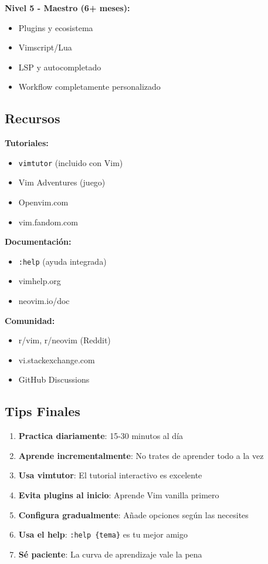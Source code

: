 \documentclass[
  doc,
  floatsintext,
  longtable,
  a4paper,
  nolmodern,
  notxfonts,
  notimes,
  12pt,
  colorlinks=true,linkcolor=blue,citecolor=blue,urlcolor=blue]{apa7}
\providecommand{\tightlist}{%
  \setlength{\itemsep}{0pt}\setlength{\parskip}{0pt}}
\begin{document}
\textbf{Nivel 5 - Maestro (6+ meses):}

\begin{itemize}
\tightlist
\item
  Plugins y ecosistema
\item
  Vimscript/Lua
\item
  LSP y autocompletado
\item
  Workflow completamente personalizado
\end{itemize}

\subsection{Recursos}\label{recursos}

\textbf{Tutoriales:}

\begin{itemize}
\tightlist
\item
  \texttt{vimtutor} (incluido con Vim)
\item
  Vim Adventures (juego)
\item
  Openvim.com
\item
  vim.fandom.com
\end{itemize}

\textbf{Documentación:}

\begin{itemize}
\tightlist
\item
  \texttt{:help} (ayuda integrada)
\item
  vimhelp.org
\item
  neovim.io/doc
\end{itemize}

\textbf{Comunidad:}

\begin{itemize}
\tightlist
\item
  r/vim, r/neovim (Reddit)
\item
  vi.stackexchange.com
\item
  GitHub Discussions
\end{itemize}

\subsection{Tips Finales}\label{tips-finales}

\begin{enumerate}
\def\labelenumi{\arabic{enumi}.}
\tightlist
\item
  \textbf{Practica diariamente}: 15-30 minutos al día
\item
  \textbf{Aprende incrementalmente}: No trates de aprender todo a la vez
\item
  \textbf{Usa vimtutor}: El tutorial interactivo es excelente
\item
  \textbf{Evita plugins al inicio}: Aprende Vim vanilla primero
\item
  \textbf{Configura gradualmente}: Añade opciones según las necesites
\item
  \textbf{Usa el help}: \texttt{:help\ \{tema\}} es tu mejor amigo
\item
  \textbf{Sé paciente}: La curva de aprendizaje vale la pena
\end{enumerate}
\end{document}
